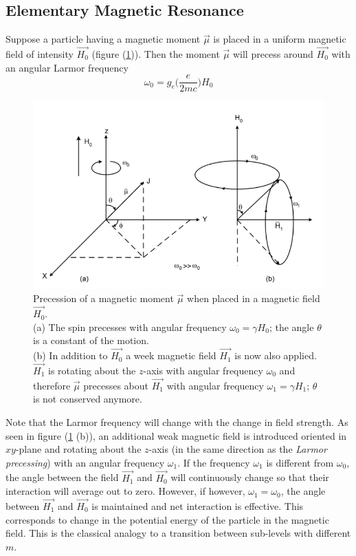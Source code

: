 \documentclass[%
 reprint,
nofootinbib,
 amsmath,amssymb,
 aps,
floatfix,
]{revtex4-2}
\begin{document}
    \subsection{Elementary Magnetic Resonance}
    Suppose a particle having a magnetic moment $\Vec{\mu}$ is placed in a uniform magnetic field of intensity $\Vec{H_0}$ (figure (\ref{fig:precession})). Then the moment $\Vec{\mu}$ will precess around $\Vec{H_0}$ with an angular Larmor frequency
    \begin{equation}
        \omega_0 = g_e \Bigg( \dfrac{e}{2 m c} \Bigg) H_0
    \end{equation}
    \begin{figure}
        \centering
        \includegraphics[scale = 0.9]{Figures/precession.png}
        \caption{Precession of a magnetic moment $\Vec{\mu}$ when placed in a magnetic field $\Vec{H_0}$. \\ (a) The spin precesses with angular frequency $\omega_0 = \gamma H_0$; the angle $\theta$ is a constant of the motion. \\ (b)  In addition to $\Vec{H_0}$ a week magnetic field $\Vec{H_1}$ is now also applied. $\Vec{H_1}$ is rotating about the $z$-axis with angular frequency $\omega_0$ and therefore $\Vec{\mu}$ precesses about $\Vec{H_1}$ with angular frequency $\omega_1 = \gamma H_1$; $\theta$ is not conserved anymore.} 
        \label{fig:precession}
    \end{figure}
    Note that the Larmor frequency will change with the change in field strength. As seen in figure (\ref{fig:precession} (b)), an additional weak magnetic field  is introduced oriented in $xy$-plane and rotating about the $z$-axis (in the same direction as the \textit{Larmor precessing}) with an angular frequency $\omega_1$. If the frequency $\omega_1$ is different from $\omega_0$, the angle between the field $\Vec{H_1}$ and $\Vec{H_0}$ will continuously change so that their interaction will average out to zero. However, if however, $\omega_1 = \omega_0$, the angle between $\Vec{H_1}$ and $\Vec{H_0}$ is maintained and net interaction is effective. This corresponds to change in the potential energy of the particle in the magnetic field. This is the classical analogy to a transition between sub-levels with different $m$.
\end{document}
